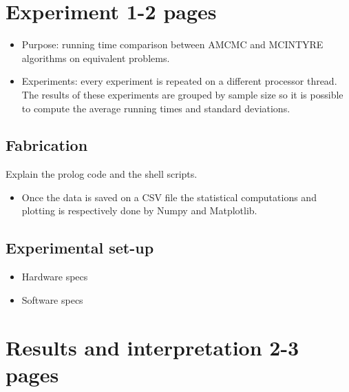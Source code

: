 \documentclass[a4paper]{article}
\begin{document}
\section{Experiment 1-2 pages}
\begin{itemize}
\item Purpose: running time comparison between AMCMC and MCINTYRE algorithms on 
      equivalent problems.
\item Experiments: every experiment is repeated on a different processor 
      thread. The results of these experiments are grouped by sample size so 
      it is possible to compute the average running times and standard 
      deviations.
\end{itemize}

\subsection{Fabrication}
Explain the prolog code and the shell scripts.
\begin{itemize}
\item Once the data is saved on a CSV file the statistical computations and 
      plotting is respectively done by Numpy and Matplotlib.
\end{itemize}

\subsection{Experimental set-up}
\begin{itemize}
    \item Hardware specs
    \item Software specs
\end{itemize}

\section{Results and interpretation 2-3 pages}
\end{document}

